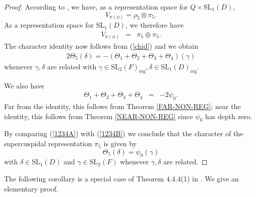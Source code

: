 \documentclass[11pt]{amsart}
\numberwithin{equation}{section}
\def\reg{\mathrm{reg}}
\def\GL{\mathrm{GL}}
\def\SL{\mathrm{SL}}
\newcommand{\<}{\left\langle}
\renewcommand{\>}{\right\rangle}
\begin{document}
\begin{proof}
According to \cite[Lemma 12.6]{HS}, we have, as a representation space for $Q \times \SL_1(D)$, 
\[
V_{\pi(\phi)} = \rho_5 \otimes \pi_5.
\]
As a representation space for $\SL_1(D)$, we therefore have
\begin{eqnarray*}
V_{\pi(\phi)} &=& \pi_5 \oplus \pi_5.
\end{eqnarray*}
The character identity now follows from (\ref{chid})  and we obtain
\begin{eqnarray}\label{1234A}
2 \Theta_5(\delta) = - (\Theta_1 + \Theta_2 + \Theta_3 + \Theta_4)(\gamma)   
\end{eqnarray}
whenever $\gamma, \delta$ are related with $\gamma \in \SL_2(F)_{\reg}, \delta \in \SL_1(D)_{\reg}$.  

We also have
\begin{eqnarray}\label{1234B}
\Theta_1 + \Theta_2 + \Theta_3 + \Theta_4 &=& - 2\psi_0.
\end{eqnarray}
Far from the identity, this follows from Theorem \ref{FAR-NON-REG}; near the identity, this follows from Theorem \ref{NEAR-NON-REG} since
$\psi_0$ has depth zero.



By comparing (\ref{1234A}) with (\ref{1234B})   we conclude that the character of the supercuspidal representation $\pi_5$  is given by
\[
\Theta_5(\delta) = \psi_0(\gamma)\]
with $\delta \in \SL_1(D)$ and $\gamma \in \SL_2(F)$ whenever $\gamma, \delta$ are related.   
\end{proof}

The following corollary is a special case of Theorem 4.4.4(1) in \cite{FKS}.  We give an elementary proof.
\end{document}
